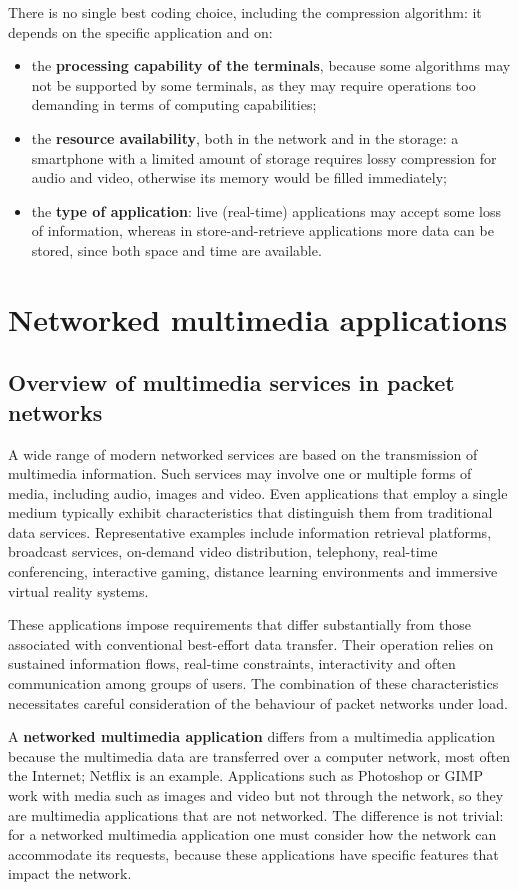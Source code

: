 There is no single best coding choice, including the compression algorithm: it depends on the specific application and on:
\begin{itemize}
	\item the \textbf{processing capability of the terminals}, because some algorithms may not be supported by some terminals, as they may require operations too demanding in terms of computing capabilities;
	\item the \textbf{resource availability}, both in the network and in the storage: a smartphone with a limited amount of storage requires lossy compression for audio and video, otherwise its memory would be filled immediately;
	\item the \textbf{type of application}: live (real-time) applications may accept some loss of information, whereas in store-and-retrieve applications more data can be stored, since both space and time are available.
\end{itemize}

\section{Networked multimedia applications}

\subsection{Overview of multimedia services in packet networks}

A wide range of modern networked services are based on the transmission of multimedia information. Such services may involve one or multiple forms of media, including audio, images and video. Even applications that employ a single medium typically exhibit characteristics that distinguish them from traditional data services. Representative examples include information retrieval platforms, broadcast services, on-demand video distribution, telephony, real-time conferencing, interactive gaming, distance learning environments and immersive virtual reality systems.

These applications impose requirements that differ substantially from those associated with conventional best-effort data transfer. Their operation relies on sustained information flows, real-time constraints, interactivity and often communication among groups of users. The combination of these characteristics necessitates careful consideration of the behaviour of packet networks under load.

A \textbf{networked multimedia application} differs from a multimedia application because the multimedia data are transferred over a computer network, most often the Internet; Netflix is an example. Applications such as Photoshop or GIMP work with media such as images and video but not through the network, so they are multimedia applications that are not networked. The difference is not trivial: for a networked multimedia application one must consider how the network can accommodate its requests, because these applications have specific features that impact the network.

